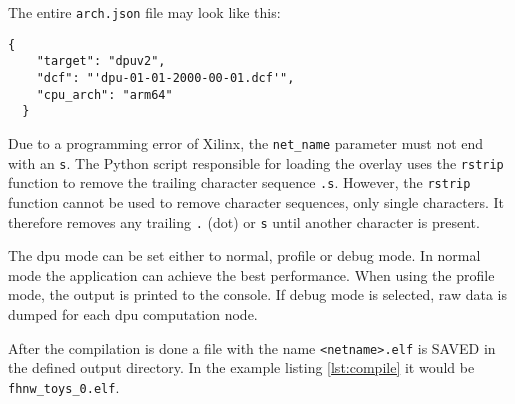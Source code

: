 The entire \texttt{arch.json} file may look like this:
\begin{lstlisting}[style=bash, caption={}, label=lst:arch_json]
  {
  	"target": "dpuv2",
  	"dcf": "'dpu-01-01-2000-00-01.dcf'",
  	"cpu_arch": "arm64"
  }
\end{lstlisting}

Due to a programming error of Xilinx, the \texttt{net\_name} parameter must not end with an \texttt{s}.
The Python script responsible for loading the overlay uses the \texttt{rstrip} function to remove the trailing character sequence \texttt{.s}.
However, the \texttt{rstrip} function cannot be used to remove character sequences, only single characters.
It therefore removes any trailing \texttt{.} (dot) or \texttt{s} until another character is present.

The \acrshort{dpu} mode can be set either to normal, profile or debug mode.
In normal mode the application can achieve the best performance.
When using the profile mode, the output is printed to the console.
If debug mode is selected, raw data is dumped for each \acrshort{dpu} computation node.

After the compilation is done a file with the name \texttt{<netname>.elf} is SAVED in the defined output directory.
In the example listing \ref{lst:compile} it would be \texttt{fhnw\_toys\_0.elf}.

